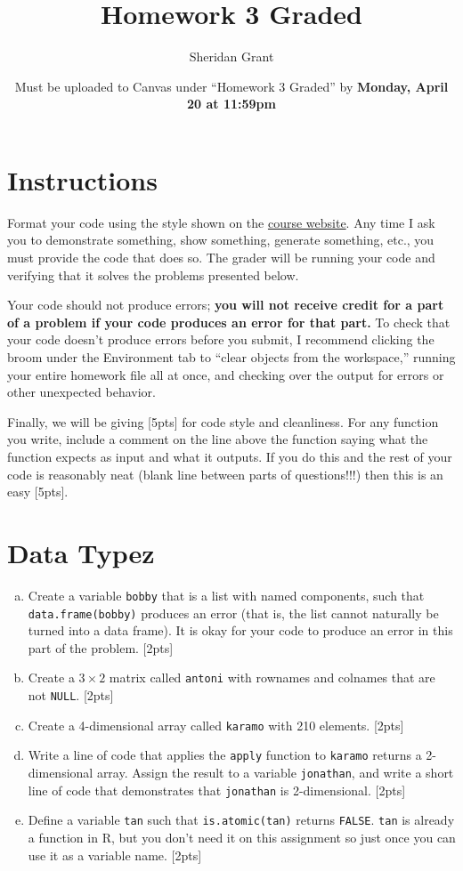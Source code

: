\documentclass[12pt]{article}
\title{Homework 3 Graded}
\author{Sheridan Grant}
\date{Must be uploaded to Canvas under ``Homework 3 Graded'' by \textbf{Monday, April 20 at 11:59pm}}
\begin{document}
\sloppy

\maketitle

\section*{Instructions}

Format your code using the style shown on the \href{https://sheridanlgrant.github.io/teaching/STAT302_SPR2020}{course website}. Any time I ask you to demonstrate something, show something, generate something, etc., you must provide the code that does so. The grader will be running your code and verifying that it solves the problems presented below.

Your code should not produce errors; \textbf{you will not receive credit for a part of a problem if your code produces an error for that part.} To check that your code doesn't produce errors before you submit, I recommend clicking the broom under the Environment tab to ``clear objects from the workspace,'' running your entire homework file all at once, and checking over the output for errors or other unexpected behavior.

Finally, we will be giving [5pts] for code style and cleanliness. For any function you write, include a comment on the line above the function saying what the function expects as input and what it outputs. If you do this and the rest of your code is reasonably neat (blank line between parts of questions!!!) then this is an easy [5pts].

\section{Data Typez}

\begin{enumerate}[(a)]
	\item Create a variable \verb|bobby| that is a list with named components, such that \verb|data.frame(bobby)| produces an error (that is, the list cannot naturally be turned into a data frame). It is okay for your code to produce an error in this part of the problem. [2pts]
	\item Create a $3 \times 2$ matrix called \verb|antoni| with rownames and colnames that are not \verb|NULL|. [2pts]
	\item Create a 4-dimensional array called \verb|karamo| with 210 elements. [2pts]
	\item Write a line of code that applies the \verb|apply| function to \verb|karamo| returns a 2-dimensional array. Assign the result to a variable \verb|jonathan|, and write a short line of code that demonstrates that \verb|jonathan| is 2-dimensional. [2pts]
	\item Define a variable \verb|tan| such that \verb|is.atomic(tan)| returns \verb|FALSE|. \verb|tan| is already a function in R, but you don't need it on this assignment so just once you can use it as a variable name. [2pts]
	
\end{enumerate}
\end{document}
